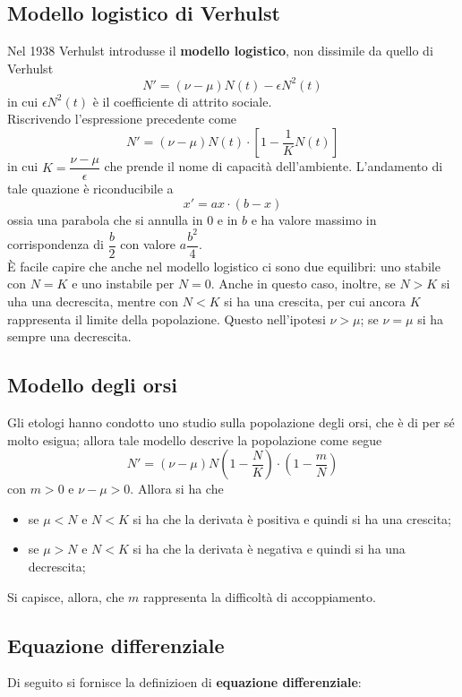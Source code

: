 \documentclass[a4paper]{extarticle}
\begin{document}
\vspace{1em}
\subsection{Modello logistico di Verhulst}
Nel 1938 Verhulst introdusse il \textbf{modello logistico}, non dissimile da quello di Verhulst
\[N'=(\nu-\mu) N(t) - \epsilon N^2(t)\]
in cui $\epsilon N^2(t)$ è il coefficiente di attrito sociale.\\
Riscrivendo l'espressione precedente come
\[N'=(\nu-\mu) N(t) \cdot \left[1-\dfrac{1}{K} N(t)\right]\]
in cui $K=\dfrac{\nu-\mu}{\epsilon}$ che prende il nome di capacità dell'ambiente. L'andamento di tale quazione è riconducibile a
\[x'=ax \cdot (b-x)\]
ossia una parabola che si annulla in $0$ e in $b$  e ha valore massimo in corrispondenza di $\dfrac{b}{2}$ con valore $a\dfrac{b^2}{4}$.\\
È facile capire che anche nel modello logistico ci sono due equilibri: uno stabile con $N=K$ e uno instabile per $N=0$. Anche in questo caso, inoltre, se $N>K$ si uha una decrescita, mentre con $N<K$ si ha una crescita, per cui ancora $K$ rappresenta il limite della popolazione. Questo nell'ipotesi $\nu>\mu$; se $\nu=\mu$ si ha sempre una decrescita.

\vspace{1em}
\subsection{Modello degli orsi}
Gli etologi hanno condotto uno studio sulla popolazione degli orsi, che è di per sé molto esigua; allora tale modello descrive la popolazione come segue
\[N'=(\nu-\mu) N \left(1-\dfrac{N}{K}\right) \cdot \left(1-\dfrac{m}{N}\right)\]
con $m>0$ e $\nu-\mu>0$. Allora si ha che
\begin{itemize}
    \item se $\mu<N$ e $N<K$ si ha che la derivata è positiva e quindi si ha una crescita;
    \item se $\mu>N$ e $N<K$ si ha che la derivata è negativa e quindi si ha una decrescita;
\end{itemize}
Si capisce, allora, che $m$ rappresenta la difficoltà di accoppiamento.

\vspace{1em}
\subsection{Equazione differenziale}
Di seguito si fornisce la definizioen di \textbf{equazione differenziale}:
\end{document}
